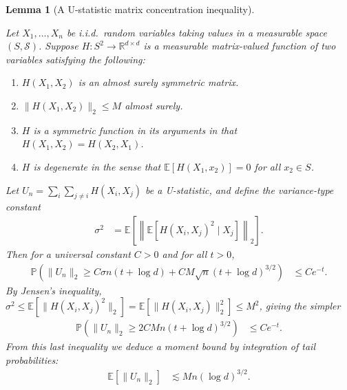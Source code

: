\documentclass[11pt,lof]{puthesis}
\renewcommand{\P}{\ensuremath{\mathbb{P}}}
\newcommand{\R}{\ensuremath{\mathbb{R}}}
\newcommand{\E}{\ensuremath{\mathbb{E}}}
\newcommand{\cS}{\ensuremath{\mathcal{S}}}
\theoremstyle{break}
\newtheorem{lemma}{Lemma}[section]
\theoremstyle{proof}
\begin{document}
\begin{lemma}[A U-statistic matrix concentration inequality]
  \label{lem:kernel_app_ustat_matrix_concentration}

  Let $X_1, \ldots, X_n$ be i.i.d.\ random variables
  taking values in a measurable space $(S, \cS)$.
  Suppose
  $H: S^2 \to \R^{d \times d}$
  is a measurable matrix-valued function
  of two variables
  satisfying the following:
  \begin{enumerate}[label=(\roman*)]

    \item
      $H(X_1, X_2)$ is an almost surely symmetric matrix.

    \item
      $\|H(X_1, X_2)\|_2 \leq M$ almost surely.

    \item
      $H$ is a symmetric function in its arguments in that
      $H(X_1, X_2) = H(X_2, X_1)$.

    \item
      $H$ is degenerate in the sense that
      $\E[H(X_1, x_2)] = 0$ for all $x_2 \in S$.

  \end{enumerate}
  Let $U_n = \sum_i \sum_{j \neq i} H(X_i, X_j)$
  be a U-statistic,
  and define the variance-type constant
  \begin{align*}
    \sigma^2
    &=
    \E\left[
      \left\|
      \E\left[
        H(X_i, X_j)^2
        \mid X_j
      \right]
      \right\|_2
    \right].
  \end{align*}
  Then for a universal constant $C > 0$
  and for all $t > 0$,
  \begin{align*}
    \P\left(
      \|U_n\|_2
      \geq
      C \sigma n (t + \log d)
      + C M \sqrt{n} (t + \log d)^{3/2}
    \right)
    &\leq
    C e^{-t}.
  \end{align*}
  By Jensen's inequality,
  $\sigma^2 \leq \E[ \| H(X_i, X_j)^2 \|_2 ]
  = \E[ \| H(X_i, X_j) \|_2^2 ] \leq M^2$, giving the simpler
  \begin{align*}
    \P\left(
      \|U_n\|_2
      \geq
      2 C M n
      (t + \log d)^{3/2}
    \right)
    &\leq
    C e^{-t}.
  \end{align*}
  From this last inequality we deduce a moment bound
  by integration of tail probabilities:
  \begin{align*}
    \E\left[
      \|U_n\|_2
    \right]
    &\lesssim
    M n (\log d)^{3/2}.
  \end{align*}

\end{lemma}
\end{document}

